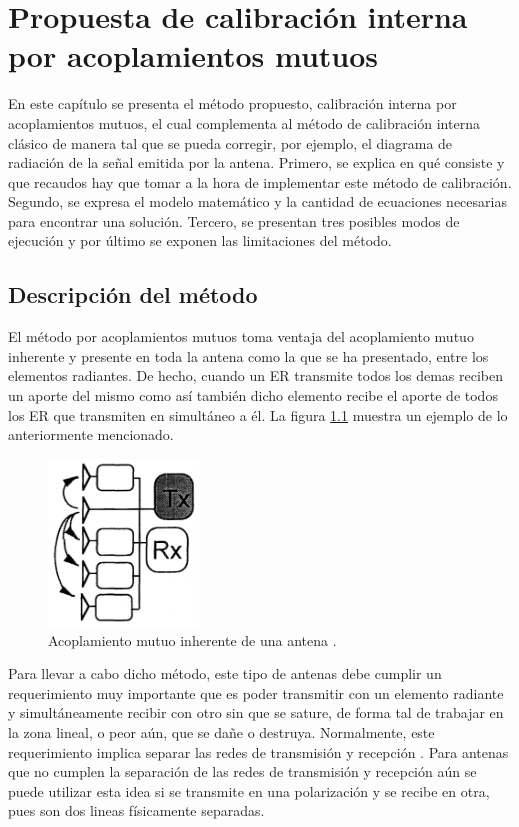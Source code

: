 \chapter{Propuesta de calibración interna por acoplamientos mutuos}
\label{ch:mutualCalibration}

En este capítulo se presenta el método propuesto, calibración interna por acoplamientos mutuos, el cual complementa al método de
calibración interna clásico de manera tal que se pueda corregir, por ejemplo, el diagrama de radiación de la señal emitida por la
antena. Primero, se explica en qué consiste y que recaudos hay que tomar a la hora de implementar este método de calibración.
Segundo, se expresa el modelo matemático y la cantidad de ecuaciones necesarias para encontrar una solución. Tercero, se
presentan tres posibles modos de ejecución y por último se exponen las limitaciones del método.  


\section{Descripción del método}

El método por acoplamientos mutuos toma ventaja del acoplamiento mutuo inherente y presente en toda la antena como la que se ha
presentado, entre los elementos radiantes. De hecho, cuando un ER transmite todos los demas reciben un aporte del mismo como así
también dicho elemento recibe el aporte de todos los ER que transmiten en simultáneo a él. La figura \ref{fig:mutualCoupling1}
muestra un ejemplo de lo anteriormente mencionado.

\begin{figure}[H]
 \centering
 \includegraphics[width=4cm]{gfx/mutualCoupling1.png}
 \caption{Acoplamiento mutuo inherente de una antena \cite{Hara1997}.}
 \label{fig:mutualCoupling1}
\end{figure}

Para llevar a cabo dicho método, este tipo de antenas debe cumplir un requerimiento muy importante que es poder transmitir con
un elemento radiante y simultáneamente recibir con otro sin que se sature, de forma tal de trabajar en la zona lineal, o peor
aún, que se dañe o destruya. Normalmente, este requerimiento implica separar las redes de transmisión y recepción
\cite{Gao2001}. Para antenas que no cumplen la separación de las redes de transmisión y recepción aún se puede utilizar esta
idea si se transmite en una polarización y se recibe en otra, pues son dos lineas físicamente separadas.

